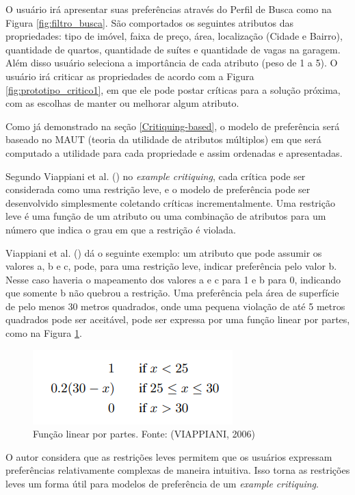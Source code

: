 O usuário irá apresentar suas preferências através do Perfil de Busca como na Figura \ref{fig:filtro_busca}. São comportados os seguintes atributos das propriedades: tipo de imóvel, faixa de preço, área, localização (Cidade e Bairro), quantidade de quartos, quantidade de suítes e quantidade de vagas na garagem. Além disso usuário seleciona a importância de cada atributo (peso de 1 a 5). O usuário irá criticar as propriedades de acordo com a Figura \ref{fig:prototipo_critico1}, em que ele pode postar críticas para a solução próxima, com as escolhas de manter ou melhorar algum atributo.

Como já demonstrado na seção \ref{Critiquing-based}, o modelo de preferência será baseado no MAUT (teoria da utilidade de atributos múltiplos) em que será computado a utilidade para cada propriedade e assim ordenadas e apresentadas.

Segundo Viappiani et al. (\citeyear{Viappiani}) no \textit{example critiquing}, cada crítica pode ser considerada como uma restrição leve, e o modelo de preferência pode ser desenvolvido simplesmente coletando críticas incrementalmente. Uma restrição leve é uma função de um atributo ou uma combinação de atributos para um número que indica o grau em que a restrição é violada.

Viappiani et al. (\citeyear{Viappiani}) dá o seguinte exemplo: um atributo que pode assumir os valores a, b e c, pode, para uma restrição leve, indicar preferência pelo valor b. Nesse caso haveria o mapeamento dos valores a e c para 1 e b para 0, indicando que somente b não quebrou a restrição. Uma preferência pela área de superfície de pelo menos 30 metros quadrados, onde uma pequena violação de até 5 metros quadrados pode ser aceitável, pode ser expressa por uma função linear por partes, como na Figura \ref{fig:funcao_linear}.

\begin{figure}[H]
    \centering
    \includegraphics[scale=0.8]{figuras/proposta/funcao_linear.png}
    \caption[Função linear por partes]{Função linear por partes. Fonte: (VIAPPIANI, 2006)}
    \label{fig:funcao_linear}
\end{figure}

O autor considera que as restrições leves permitem que os usuários expressam preferências relativamente complexas de maneira intuitiva. Isso torna as restrições leves um forma útil para modelos de preferência de um \textit{example critiquing}.

